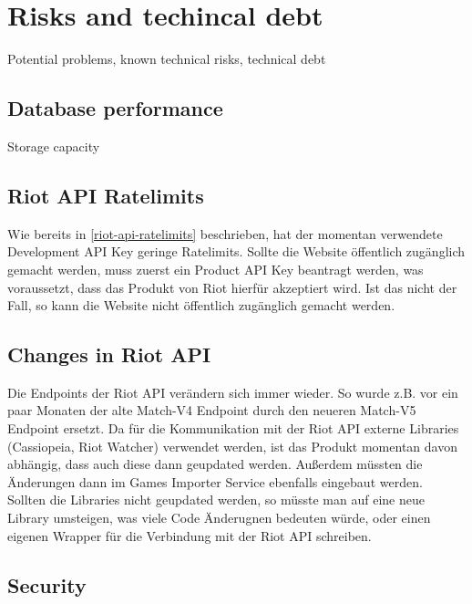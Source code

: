 \section{Risks and techincal debt}
Potential problems, known technical risks, technical debt

\subsection{Database performance}
Storage capacity

\subsection{Riot API Ratelimits}
Wie bereits in \ref{riot-api-ratelimits} beschrieben, hat der momentan verwendete Development API Key geringe Ratelimits. Sollte die Website öffentlich zugänglich gemacht werden, muss zuerst ein Product API Key beantragt werden, was voraussetzt, dass das Produkt von Riot hierfür akzeptiert wird. Ist das nicht der Fall, so kann die Website nicht öffentlich zugänglich gemacht werden.

\subsection{Changes in Riot API}
Die Endpoints der Riot API verändern sich immer wieder. So wurde z.B. vor ein paar Monaten der alte Match-V4 Endpoint durch den neueren Match-V5 Endpoint ersetzt. Da für die Kommunikation mit der Riot API externe Libraries (Cassiopeia, Riot Watcher) verwendet werden, ist das Produkt momentan davon abhängig, dass auch diese dann geupdated werden.
Außerdem müssten die Änderungen dann im Games Importer Service ebenfalls eingebaut werden.\\ Sollten die Libraries nicht geupdated werden, so müsste man auf eine neue Library umsteigen, was viele Code Änderugnen bedeuten würde, oder einen eigenen Wrapper für die Verbindung mit der Riot API schreiben.

\subsection{Security}